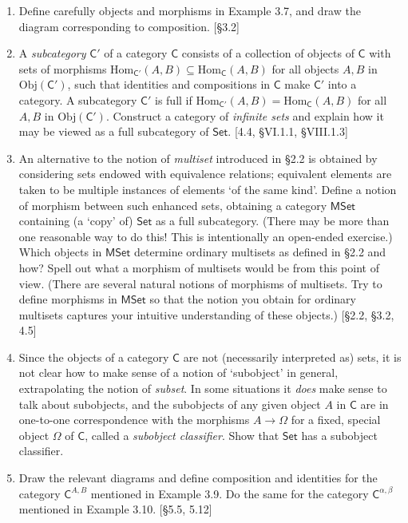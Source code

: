 \begin{enumerate}
    \item Define carefully objects and morphisms in Example 3.7, and draw the diagram corresponding to composition. [\S3.2]

    \item A \textit{subcategory} $\mathsf{C}'$ of a category $\mathsf{C}$ consists of a collection of objects of $\mathsf{C}$ with sets of morphisms $\mathrm{Hom}_{\mathsf{C}'}(A, B) \subseteq \mathrm{Hom}_{\mathsf{C}}(A, B)$ for all objects $A, B$ in $\mathrm{Obj}(\mathsf{C}')$, such that identities and compositions in $\mathsf{C}$ make $\mathsf{C}'$ into a category. A subcategory $\mathsf{C}'$ is full if $\mathrm{Hom}_{\mathsf{C}'}(A, B) = \mathrm{Hom}_{\mathsf{C}}(A, B)$ for all $A, B$ in $\mathrm{Obj}(\mathsf{C}')$. Construct a category of \textit{infinite sets} and explain how it may be viewed as a full subcategory of $\mathsf{Set}$. [4.4, \S VI.1.1, \S VIII.1.3]

    \item An alternative to the notion of \textit{multiset} introduced in \S2.2 is obtained by considering sets endowed with equivalence relations; equivalent elements are taken to be multiple instances of elements `of the same kind'. Define a notion of morphism between such enhanced sets, obtaining a category $\mathsf{MSet}$ containing (a `copy' of) $\mathsf{Set}$ as a full subcategory. (There may be more than one reasonable way to do this! This is intentionally an open-ended exercise.) Which objects in $\mathsf{MSet}$ determine ordinary multisets as defined in \S2.2 and how? Spell out what a morphism of multisets would be from this point of view. (There are several natural notions of morphisms of multisets. Try to define morphisms in $\mathsf{MSet}$ so that the notion you obtain for ordinary multisets captures your intuitive understanding of these objects.) [\S2.2, \S3.2, 4.5]

    \item Since the objects of a category $\mathsf{C}$ are not (necessarily interpreted as) sets, it is not clear how to make sense of a notion of `subobject' in general, extrapolating the notion of \emph{subset}. In some situations it \textit{does} make sense to talk about subobjects, and the subobjects of any given object $A$ in $\mathsf{C}$ are in one-to-one correspondence with the morphisms $A \to \Omega$ for a fixed, special object $\Omega$ of $\mathsf{C}$, called a \textit{subobject classifier}. Show that $\mathsf{Set}$ has a subobject classifier.

    \item Draw the relevant diagrams and define composition and identities for the category $\mathsf{C}^{A,B}$ mentioned in Example 3.9. Do the same for the category $\mathsf{C}^{\alpha,\beta}$ mentioned in Example 3.10. [\S5.5, 5.12]
\end{enumerate}